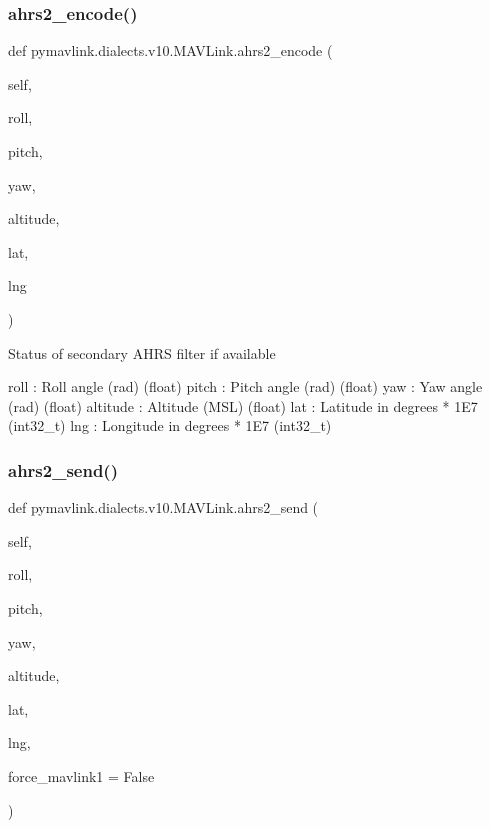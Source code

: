 \subsubsection{\texorpdfstring{ahrs2\+\_\+encode()}{ahrs2\_encode()}}
{\footnotesize\ttfamily def pymavlink.\+dialects.\+v10.\+M\+A\+V\+Link.\+ahrs2\+\_\+encode (\begin{DoxyParamCaption}\item[{}]{self,  }\item[{}]{roll,  }\item[{}]{pitch,  }\item[{}]{yaw,  }\item[{}]{altitude,  }\item[{}]{lat,  }\item[{}]{lng }\end{DoxyParamCaption})}

\begin{DoxyVerb}Status of secondary AHRS filter if available

roll                      : Roll angle (rad) (float)
pitch                     : Pitch angle (rad) (float)
yaw                       : Yaw angle (rad) (float)
altitude                  : Altitude (MSL) (float)
lat                       : Latitude in degrees * 1E7 (int32_t)
lng                       : Longitude in degrees * 1E7 (int32_t)\end{DoxyVerb}
 \mbox{\label{classpymavlink_1_1dialects_1_1v10_1_1MAVLink_a1dab3c7a9295dba93d628b20729f9187}} 
\subsubsection{\texorpdfstring{ahrs2\+\_\+send()}{ahrs2\_send()}}
{\footnotesize\ttfamily def pymavlink.\+dialects.\+v10.\+M\+A\+V\+Link.\+ahrs2\+\_\+send (\begin{DoxyParamCaption}\item[{}]{self,  }\item[{}]{roll,  }\item[{}]{pitch,  }\item[{}]{yaw,  }\item[{}]{altitude,  }\item[{}]{lat,  }\item[{}]{lng,  }\item[{}]{force\+\_\+mavlink1 = {\ttfamily False} }\end{DoxyParamCaption})}

